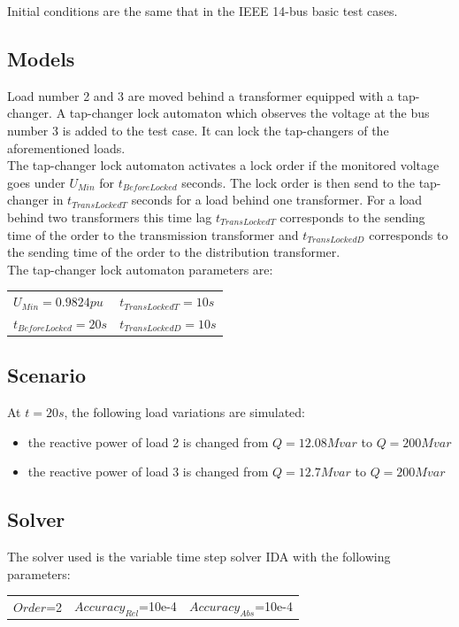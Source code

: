 \documentclass[a4paper, 12pt]{report}
\begin{document}
Initial conditions are the same that in the IEEE 14-bus basic test cases.

\subsection{Models}

Load number 2 and 3 are moved behind a transformer equipped with a tap-changer. A tap-changer lock automaton which observes the voltage at the bus number 3 is added to the test case. It can lock the tap-changers of the aforementioned loads. \\

The tap-changer lock automaton activates a lock order if the monitored voltage goes under $U_{Min}$ for $t_{BeforeLocked}$ seconds. The lock order is then send to the tap-changer in $t_{TransLockedT}$ seconds for a load behind one transformer. For a load behind two transformers this time lag $t_{TransLockedT}$ corresponds to the sending time of the order to the transmission transformer and $t_{TransLockedD}$ corresponds to the sending time of the order to the distribution transformer. \\

The tap-changer lock automaton parameters are:
\begin{center}
\begin{tabular}{l|l}
   $U_{Min}=0.9824pu$ & $t_{TransLockedT}=10s$ \\
   $t_{BeforeLocked}=20s$  & $t_{TransLockedD}=10s$ \\
\end{tabular}
\end{center}

\subsection{Scenario}
At $t=20s$, the following load variations are simulated:
\begin{itemize}
\item{the reactive power of load 2 is changed from $Q=12.08Mvar$ to $Q=200Mvar$}
\item{the reactive power of load 3 is changed from $Q=12.7Mvar$ to $Q=200Mvar$}
\end{itemize}

\subsection{Solver}
The solver used is the variable time step solver IDA with the following parameters:
\begin{center}
\begin{tabular}{l|l|l}
   $Order$=2 & $Accuracy_{Rel}$=10e-4 & $Accuracy_{Abs}$=10e-4 \\
\end{tabular}
\end{center}
\end{document}

